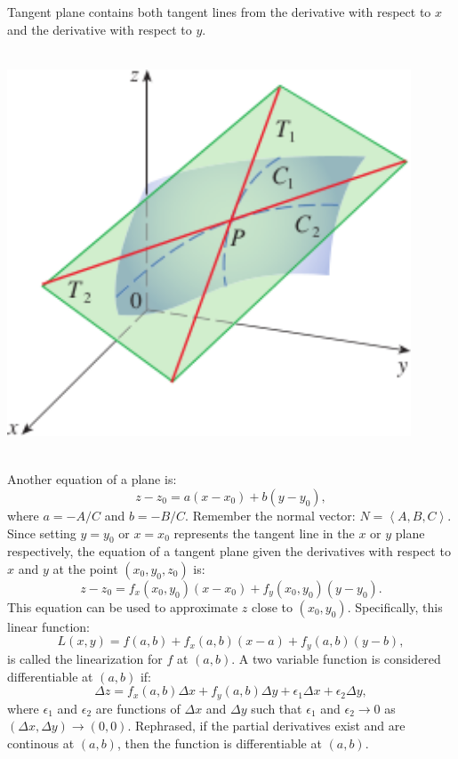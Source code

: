 \documentclass{article}
\begin{document}
Tangent plane contains both tangent lines from the derivative with respect to $x$
and the derivative with respect to $y$.  
\begin{center}
    \includegraphics[width=12cm,height=12cm, keepaspectratio]{Images/TangentPlane.png}
\end{center}

Another equation of a plane is:
\[z-z_0=a(x-x_0) + b(y-y_0),\]
where $a = -A/C$ and $b = -B/C$. Remember the normal vector:
 $N = \left\langle A, B, C \right\rangle.$ Since setting $y=y_0$ or
 $x=x_0$ represents the tangent line in the $x$ or $y$ plane respectively, 
 the equation of a tangent plane given the derivatives with respect to $x$ and $y$
 at the point $(x_0, y_0, z_0)$ is: 
 \[z-z_0 = f_x(x_0, y_0)(x-x_0) + f_y(x_0, y_0)(y-y_0).\]
 This equation can be used to 
 approximate $z$ close to $(x_0, y_0)$. Specifically, this linear function:
 \[L(x,y) = f(a,b) +f_x(a,b)(x-a)+f_y(a,b)(y-b),\] is called
 the linearization for $f$ at $(a,b).$ A two variable function is
considered differentiable at $(a,b)$ if:
\[\Delta z = f_x(a,b)\Delta x + f_y(a,b)\Delta y + \epsilon_1\Delta x + \epsilon_2\Delta y,\]
where $\epsilon_1$ and $\epsilon_2$ are functions of $\Delta x$ and $\Delta y$
such that $\epsilon_1$ and $\epsilon_2 \to 0$ as $(\Delta x,\Delta y) \to (0,0).$
Rephrased, if the partial derivatives exist and are continous at $(a,b)$,
then the function is differentiable at $(a,b)$. 
\end{document}
